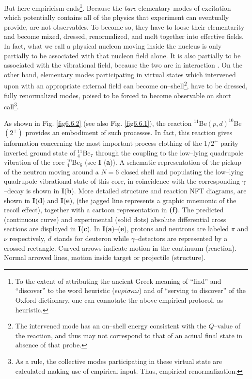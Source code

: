 But here empiricism ends\footnote{To the extent of attributing the ancient Greek meaning of ``find'' and ``discover'' to the word heuristic ($\epsilon\upsilon\rho i \sigma\kappa\omega$) and of ``serving to discover'' of the Oxford dictionary, one can connotate the above empirical protocol, as heuristic.}. Because the \textit{bare} elementary modes of excitation which potentially contains all of the physics that experiment can eventually provide, are not observables. To become so, they have to loose their elementarity and become mixed, dressed, renormalized, and melt together into effective fields. In fact, what we call a physical nucleon moving inside the nucleus is only partially to be associated with that nucleon field alone. It is also partially to be associated with the vibrational field, because the two are in interaction . On the other hand, elementary modes participating in virtual states which intervened upon with an appropriate external field can become on--shell\footnote{The intervened mode has an on--shell energy consistent with the $Q$--value of the reaction, and thus may not correspond to that of an actual final state in absence of that probe.\label{footnote2}}, have to be dressed, fully renormalized modes, poised to be forced to become observable on short call\footnote{As a rule, the collective modes participating in these virtual state are calculated making use of empirical input. Thus, empirical renormalization.}.


As shown in Fig. \ref{fig6.6.2} (see also Fig. \ref{fig6.6.1}), the reaction $^{11}$Be$(p,d)^{10}$Be$(2^+)$ provides an embodiment of such processes.  	 In fact, this reaction gives information concerning the most important process   clothing  of the $1/2^+$ parity inverted ground state of $^{11}_4$Be$_{7}$
  	through the coupling to the low--lying quadrupole vibration of the core $^{10}_4$Be$_6$ (see \textbf{I} (\textbf{a})). A schematic representation 
  	of the pickup of the neutron moving around a $N=6$ closed shell and populating the low--lying
  	quadrupole vibrational state of this core, in coincidence with the corresponding $\gamma$--decay is shown in \textbf{I}(\textbf{b}).  More  detailed structure and reaction NFT diagrams,  
  are	shown in  \textbf{I}(\textbf{d}) and \textbf{I}(\textbf{e}), (the jagged line represents 
  	  	a graphic mnemonic of the recoil effect),  together with a cartoon representation in {\bf (f)}. The predicted (continuous curve) and experimental
  	  	  	(solid dots) absolute differential cross sections   are displayed in \textbf{I}(\textbf{c}).
  In \textbf{I}(\textbf{a})--(\textbf{e}),	protons 
  	and neutrons are labeled $\pi$ and $\nu$ respectively,  $d$ stands for deuteron while $\gamma$--detectors are represented by a crossed rectangle.
  	Curved arrows indicate  motion in the continuum (reaction). Normal arrowed 
  	lines, motion inside target or projectile (structure).  
  	
